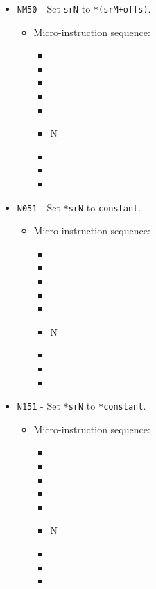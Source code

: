 \documentclass{article}
\begin{document}
\begin{itemize}
    \item \Verb|NM50| - Set \Verb|srN| to \Verb|*(srM+offs)|.
    \begin{itemize}
        \item Micro-instruction sequence:
        \begin{itemize}
            \item \pkptroutinc
            \item \datatooffs
            \item \incrementpk
            \item \pkptroutinc
            \item \holddata
            \item \specialtoaddr N
            \item \writeRAMo
            \item \incrementpk
            \item \done
        \end{itemize}
    \end{itemize}

    
    \item \Verb|N051| - Set \Verb|*srN| to \Verb|constant|.
    \begin{itemize}
        \item Micro-instruction sequence:
        \begin{itemize}
            \item \pkptroutinc
            \item \datatooffs
            \item \incrementpk
            \item \pkptroutinc
            \item \holddata
            \item \specialtoaddr N
            \item \writeRAMo
            \item \incrementpk
            \item \done
        \end{itemize}
    \end{itemize}
    
    \item \Verb|N151| - Set \Verb|*srN| to \Verb|*constant|.
    \begin{itemize}
        \item Micro-instruction sequence:
        \begin{itemize}
            \item \pkptroutinc
            \item \datatooffs
            \item \incrementpk
            \item \pkptroutinc
            \item \holddata
            \item \specialtoaddr N
            \item \writeRAMo
            \item \incrementpk
            \item \done
        \end{itemize}
    \end{itemize}
    

\end{itemize}
\end{document}
